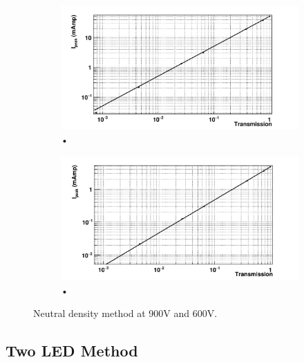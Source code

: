 \begin{figure}
\centering
\begin{subfigure}[b]{\textwidth}
\includegraphics[width=\textwidth]{chapters/graphs/PMTchar/PMT900V_linearityNDmethod.pdf}
\caption{•}
\end{subfigure}
\begin{subfigure}[b]{\textwidth}
\includegraphics[width=\textwidth]{chapters/graphs/PMTchar/PMT600V_linearityNDmethod.pdf}
\caption{•}
\end{subfigure}
\caption{Neutral density method at 900V and 600V.}
\end{figure}

\subsection{Two LED Method}

